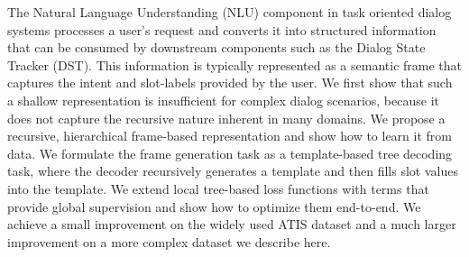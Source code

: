 The Natural Language Understanding (NLU) component in task oriented dialog systems processes a user's request and converts it into structured information that can be consumed by downstream components such as the Dialog State Tracker (DST). This information is typically represented as a semantic frame that captures the intent and slot-labels provided by the user. We first show that such a shallow representation is insufficient for complex dialog scenarios, because it does not capture the recursive nature inherent in many domains. We propose a recursive, hierarchical frame-based representation and show how to learn it from data. We formulate the frame generation task as a template-based tree decoding task, where the decoder recursively generates a template and then fills slot values into the template. We extend local tree-based loss functions with terms that provide global supervision and show how to optimize them end-to-end. We achieve a small improvement on the widely used ATIS dataset and a much larger improvement on a more complex dataset we describe here.
